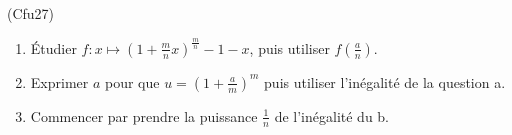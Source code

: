 \begin{tiny}(Cfu27)\end{tiny}
\begin{enumerate}
 \item \'Etudier $f: x\mapsto (1+\frac{m}{n}x)^{\frac{m}{n}} - 1 - x$,
puis utiliser $f(\frac{a}{n})$.
\item Exprimer $a$ pour que $u = (1+\frac{a}{m})^{m}$ puis utiliser l'inégalité de la question a.
\item Commencer par prendre la puissance $\frac{1}{n}$ de l'inégalité du b.
\end{enumerate}
